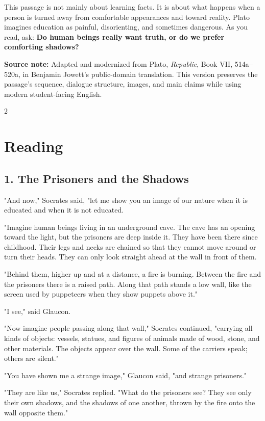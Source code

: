 \documentclass[12pt]{article}
\newcommand{\focusbox}[1]{%
\vspace{0.4em}\noindent\colorbox{gray!12}{\begin{minipage}{0.96\linewidth}#1\end{minipage}}\vspace{0.5em}}
\begin{document}
This passage is not mainly about learning facts. It is about what happens when a person is turned away from comfortable appearances and toward reality. Plato imagines education as painful, disorienting, and sometimes dangerous. As you read, ask: \textbf{Do human beings really want truth, or do we prefer comforting shadows?}

\focusbox{\textbf{Source note:} Adapted and modernized from Plato, \textit{Republic}, Book VII, 514a--520a, in Benjamin Jowett's public-domain translation. This version preserves the passage's sequence, dialogue structure, images, and main claims while using modern student-facing English.}

\begin{multicols}{2}
\section*{Reading}

\subsection*{1. The Prisoners and the Shadows}
"And now," Socrates said, "let me show you an image of our nature when it is educated and when it is not educated.

"Imagine human beings living in an underground cave. The cave has an opening toward the light, but the prisoners are deep inside it. They have been there since childhood. Their legs and necks are chained so that they cannot move around or turn their heads. They can only look straight ahead at the wall in front of them.

"Behind them, higher up and at a distance, a fire is burning. Between the fire and the prisoners there is a raised path. Along that path stands a low wall, like the screen used by puppeteers when they show puppets above it."

"I see," said Glaucon.

"Now imagine people passing along that wall," Socrates continued, "carrying all kinds of objects: vessels, statues, and figures of animals made of wood, stone, and other materials. The objects appear over the wall. Some of the carriers speak; others are silent."

"You have shown me a strange image," Glaucon said, "and strange prisoners."

"They are like us," Socrates replied. "What do the prisoners see? They see only their own shadows, and the shadows of one another, thrown by the fire onto the wall opposite them."


\end{multicols}
\end{document}
